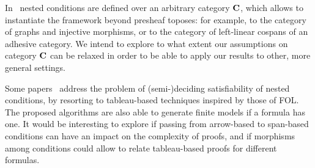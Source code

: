 In~\cite{bchk:conditional-reactive-systems,sksclo:coinductive-techniques-for-satisfiability} nested conditions are defined over an arbitrary category $\mathbf{C}$, which allows to instantiate the framework beyond presheaf toposes: for example, to the category of graphs and injective morphisms, or to the category of left-linear cospans of an adhesive category. We intend to explore to what extent our assumptions on category $\mathbf{C}$ can be relaxed in order to be able to apply our results to other, more general settings.

Some papers~\cite{lo:tableau-graph-properties,slo:model-generation,sksclo:coinductive-techniques-for-satisfiability} address the problem of (semi-)deciding satisfiability of nested conditions, by resorting to tableau-based techniques inspired by those of FOL. The proposed algorithms are also able to generate finite models if a formula has one.
It would be interesting to explore if passing from arrow-based to span-based conditions can have an impact on the complexity of proofs, and if morphisms among conditions could allow to relate tableau-based proofs for different formulas.
